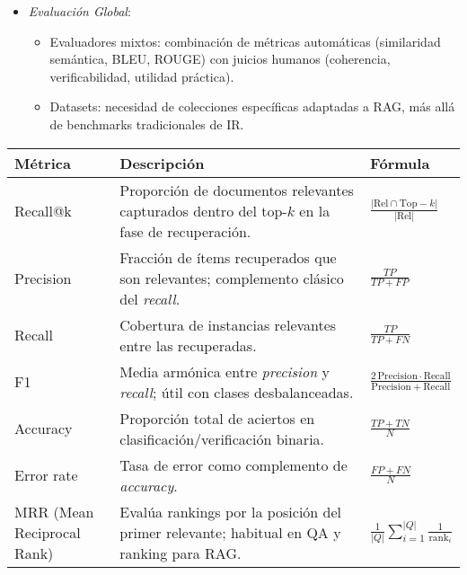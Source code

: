 \begin{itemize}
\begin{itemize}
        \item \textit{Evaluación Global}: 
        \begin{itemize}
            \item Evaluadores mixtos: combinación de métricas automáticas (similaridad semántica, BLEU, ROUGE) con juicios humanos (coherencia, verificabilidad, utilidad práctica).
            \item Datasets: necesidad de colecciones específicas adaptadas a RAG, más allá de benchmarks tradicionales de IR.
        \end{itemize}
    \end{itemize}
    
\end{itemize}


\begin{tabularx}{\textwidth}{L{0.22\textwidth} Y C{0.34\textwidth}}
    \toprule
    \textbf{Métrica} & \textbf{Descripción} & \textbf{Fórmula} \\
    \midrule

    Recall@k & Proporción de documentos relevantes capturados dentro del top-$k$ en la fase de recuperación. &
    $\displaystyle \frac{\lvert \mathrm{Rel}\cap \mathrm{Top}\!-\!k\rvert}{\lvert \mathrm{Rel}\rvert}$ \\[4pt]

    Precision & Fracción de ítems recuperados que son relevantes; complemento clásico del \textit{recall}. &
    $\displaystyle \frac{TP}{TP+FP}$ \\[4pt]

    Recall & Cobertura de instancias relevantes entre las recuperadas. &
    $\displaystyle \frac{TP}{TP+FN}$ \\[4pt]

    F1 & Media armónica entre \textit{precision} y \textit{recall}; útil con clases desbalanceadas. &
    $\displaystyle \frac{2\,\mathrm{Precision}\cdot \mathrm{Recall}}{\mathrm{Precision}+\mathrm{Recall}}$ \\[4pt]

    Accuracy & Proporción total de aciertos en clasificación/verificación binaria. &
    $\displaystyle \frac{TP+TN}{N}$ \\[4pt]

    Error rate & Tasa de error como complemento de \textit{accuracy}. &
    $\displaystyle \frac{FP+FN}{N}$ \\[4pt]

    MRR (Mean Reciprocal Rank) & Evalúa rankings por la posición del primer relevante; habitual en QA y ranking para RAG. &
    $\displaystyle \frac{1}{\lvert Q\rvert}\sum_{i=1}^{\lvert Q\rvert}\frac{1}{\mathrm{rank}_i}$ \\[4pt]


\end{tabularx}
